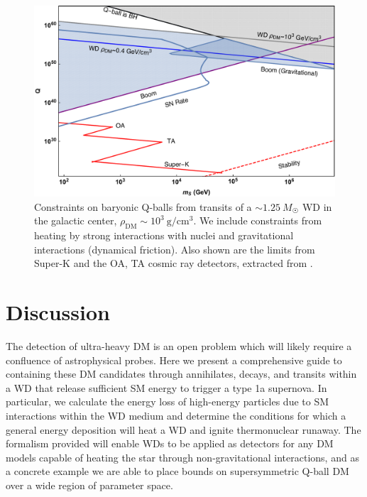 \documentclass[twocolumn, preprintnumbers,amsmath,amssymb,prd, superscriptaddress]{revtex4}
\begin{document}
\begin{figure}
\includegraphics[scale=.3]{Qballconstraint.pdf}
\caption{Constraints on baryonic Q-balls from transits of a $\sim 1.25 ~M_{\astrosun}$ WD in the galactic center, $\rho_\text{DM} \sim 10^3 ~\text{g}/\text{cm}^3$.
We include constraints from heating by strong interactions with nuclei and gravitational interactions (dynamical friction).
Also shown are the limits from Super-K and the OA, TA cosmic ray detectors, extracted from \cite{Dine:2003ax}.}
\label{fig:Qballconstraint}
\end{figure}

\section{Discussion}
\label{sec:Discussion}

The detection of ultra-heavy DM is an open problem which will likely require a confluence of astrophysical probes.
Here we present a comprehensive guide to containing these DM candidates through annihilates, decays, and transits within a WD that release sufficient SM energy to trigger a type 1a supernova.
In particular, we calculate the energy loss of high-energy particles due to SM interactions within the WD medium and determine the conditions for which a general energy deposition will heat a WD and ignite thermonuclear runaway.
The formalism provided will enable WDs to be applied as detectors for any DM models capable of heating the star through non-gravitational interactions, and as a concrete example we are able to place bounds on supersymmetric Q-ball DM over a wide region of parameter space.
\end{document}
